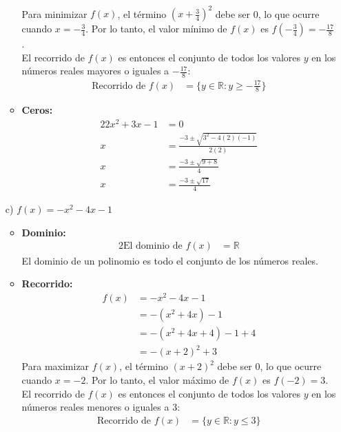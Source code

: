 \documentclass{templateNote}
\begin{document}
\begin{itemize}
\begin{itemize}
\begin{align*}
        \end{align*}
        Para minimizar \( f(x) \), el término \( (x + \frac{3}{4})^2 \) debe ser 0, lo que ocurre cuando \( x = -\frac{3}{4} \). Por lo tanto, el valor mínimo de \( f(x) \) es \( f(-\frac{3}{4}) = -\frac{17}{8} \).\\
        El recorrido de \( f(x) \) es entonces el conjunto de todos los valores \( y \) en los números reales mayores o iguales a \( -\frac{17}{8} \):
        \begin{align*}
            \text{Recorrido de } f(x) &= \{y \in \mathbb{R} : y \geq -\frac{17}{8}\}
        \end{align*}
        \item \textbf{Ceros:}
        \begin{alignat*}{2}
            2x^2 + 3x - 1 &= 0 \\
            x &= \frac{-3 \pm \sqrt{3^2 - 4(2)(-1)}}{2(2)} \\
            x &= \frac{-3 \pm \sqrt{9 + 8}}{4} \\
            x &= \frac{-3 \pm \sqrt{17}}{4}
        \end{alignat*}
    \end{itemize}
    \item[c)] $f(x) = -x^2 - 4x - 1$
    \begin{itemize}
        \item \textbf{Dominio:}
        \begin{alignat*}{2}
            \text{El dominio de } f(x) &= \mathbb{R}
        \end{alignat*}
        El dominio de un polinomio es todo el conjunto de los números reales.
        \item \textbf{Recorrido:}
        \begin{align*}
            f(x) &= -x^2 - 4x - 1 \\
            &= -(x^2 + 4x) - 1 \\
            &= -(x^2 + 4x + 4) - 1 + 4 \\
            &= -(x + 2)^2 + 3
        \end{align*}
        Para maximizar \( f(x) \), el término \( (x + 2)^2 \) debe ser 0, lo que ocurre cuando \( x = -2 \). Por lo tanto, el valor máximo de \( f(x) \) es \( f(-2) = 3 \).\\
        El recorrido de \( f(x) \) es entonces el conjunto de todos los valores \( y \) en los números reales menores o iguales a 3:
        \begin{align*}
            \text{Recorrido de } f(x) &= \{y \in \mathbb{R} : y \leq 3\}

\end{align*}
\end{itemize}
\end{itemize}
\end{document}
